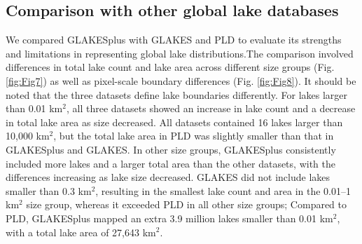 \documentclass[preprint,12pt,authoryear]{elsarticle}
\begin{document}
\subsection{Comparison with other global lake databases}
\label{subsec33}

We compared GLAKESplus with GLAKES and PLD to evaluate its strengths and limitations in representing global lake distributions.The comparison involved differences in total lake count and  lake area across different size groups (Fig. \ref{fig:Fig7}) as well as pixel-scale boundary differences (Fig. \ref{fig:Fig8}). It should be noted that the three datasets define lake boundaries differently. For lakes larger than 0.01 km$^2$, all three datasets showed an increase in lake count and a decrease in total lake area as size decreased. All datasets contained 16 lakes larger than 10,000 km$^2$, but the total lake area in PLD was slightly smaller than that in GLAKESplus and GLAKES. In other size groups, GLAKESplus consistently included more lakes and a larger total area than the other datasets, with the differences increasing as lake size decreased. GLAKES did not include lakes smaller than 0.3 km$^2$, resulting in the smallest lake count and area in the 0.01–1 km$^2$ size group, whereas it exceeded PLD in all other size groups; Compared to PLD, GLAKESplus mapped an extra 3.9 million lakes smaller than 0.01 km$^2$, with a total lake area of 27,643 km$^2$. 
\end{document}
